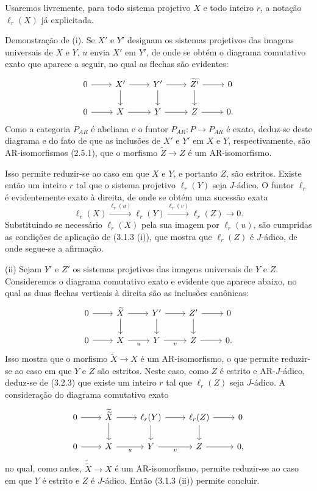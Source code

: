 \begin{prooftext}[Demonstração]
Usaremos livremente, para todo sistema projetivo $X$ e todo inteiro $r$, a notação $\ell_r(X)$ já explicitada.

Demonstração de (i). Se $X'$ e $Y'$ designam os sistemas projetivos das imagens universais de $X$ e $Y$, $u$ envia $X'$ em $Y'$, de onde se obtém o diagrama comutativo exato que aparece a seguir, no qual as flechas são evidentes:
\[
\begin{tikzcd}
0 \arrow[r] & X' \arrow[r] \arrow[d] & Y' \arrow[r] \arrow[d] & \widetilde{Z'} \arrow[r] \arrow[d] & 0\\
0 \arrow[r] & X \arrow[r] & Y \arrow[r] & Z \arrow[r] & 0 .
\end{tikzcd}
\]
Como a categoria $P_{AR}$ é abeliana e o funtor $P_{AR}\colon P\to P_{AR}$ é exato, deduz-se deste diagrama e do fato de que as inclusões de $X'$ e $Y'$ em $X$ e $Y$, respectivamente, são AR-isomorfismos (2.5.1), que o morfismo $\widetilde Z\to Z$ é um AR-isomorfismo.

Isso permite reduzir-se ao caso em que $X$ e $Y$, e portanto $Z$, são estritos. Existe então um inteiro $r$ tal que o sistema projetivo $\ell_r(Y)$ seja $J$-ádico. O funtor $\ell_r$ é evidentemente exato à direita, de onde se obtém uma sucessão exata
\[
\ell_r(X)\stackrel{\ell_r(u)}{\longrightarrow}\ell_r(Y)\stackrel{\ell_r(v)}{\longrightarrow}\ell_r(Z)\longrightarrow0.
\]
Substituindo se necessário $\ell_r(X)$ pela sua imagem por $\ell_r(u)$, são cumpridas as condições de aplicação de (3.1.3 (i)), que mostra que $\ell_r(Z)$ é $J$-ádico, de onde segue-se a afirmação.

(ii) Sejam $Y'$ e $Z'$ os sistemas projetivos das imagens universais de $Y$ e $Z$. Consideremos o diagrama comutativo exato e evidente que aparece abaixo, no qual as duas flechas verticais à direita são as inclusões canônicas:
\[
\begin{tikzcd}
0 \arrow[r] & \widetilde X \arrow[r] \arrow[d] & Y' \arrow[r] \arrow[d] & Z' \arrow[r] \arrow[d] & 0\\
0 \arrow[r] & X \arrow[r,"u"'] & Y \arrow[r,"v"'] & Z \arrow[r] & 0 .
\end{tikzcd}
\]
Isso mostra que o morfismo $\widetilde X\to X$ é um AR-isomorfismo, o que permite reduzir-se ao caso em que $Y$ e $Z$ são estritos. Neste caso, como $Z$ é estrito e AR-$J$-ádico, deduz-se de (3.2.3) que existe um inteiro $r$ tal que $\ell_r(Z)$ seja $J$-ádico. A consideração do diagrama comutativo exato
\[
\begin{tikzcd}
0 \arrow[r] & \widetilde{\widetilde X} \arrow[r] \arrow[d] & \ell_r(Y) \arrow[r] \arrow[d] & \ell_r(Z) \arrow[r] \arrow[d] & 0\\
0 \arrow[r] & X \arrow[r,"u"'] & Y \arrow[r,"v"'] & Z \arrow[r] & 0,
\end{tikzcd}
\]
no qual, como antes, $\widetilde{\widetilde X}\to X$ é um AR-isomorfismo, permite reduzir-se ao caso em que $Y$ é estrito e $Z$ é $J$-ádico. Então (3.1.3 (ii)) permite concluir.
\end{prooftext}
